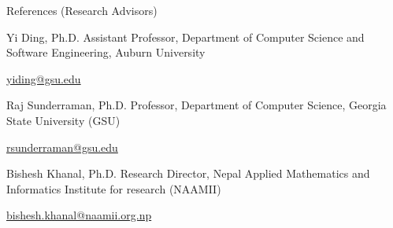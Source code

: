 \documentclass[]{kyvernitis-resume}
\begin{document}


\begin{section}{References (Research Advisors)}
    \begin{subsectionnobullet}
        {Yi Ding, Ph.D.}{ {\normalfont Assistant Professor,} Department of Computer Science and Software Engineering, Auburn University}{}{}
        \item{\href{mailto:yiding@gsu.edu}{\ttfamily yiding@gsu.edu}}
    \end{subsectionnobullet}
    \begin{subsectionnobullet}
        {Raj Sunderraman, Ph.D.}{ {\normalfont Professor,} Department of Computer Science, Georgia State University (GSU)}{}{}
        \item{\href{mailto:rsunderraman@gsu.edu}{\ttfamily rsunderraman@gsu.edu}}
    \end{subsectionnobullet}
    \begin{subsectionnobullet}
        {Bishesh Khanal, Ph.D.}{ {\normalfont Research Director,} Nepal Applied Mathematics and Informatics Institute for research (NAAMII)}{}{}
        \item{\href{mailto:bishesh.khanal@naamii.org.np}{ \ttfamily bishesh.khanal@naamii.org.np}}
    \end{subsectionnobullet}

\end{section}


\end{document}
